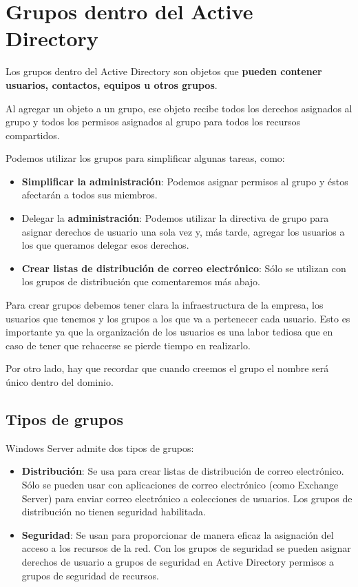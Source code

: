 \section{Grupos dentro del Active Directory}
Los grupos dentro del Active Directory son objetos que \textbf{pueden contener usuarios, contactos, equipos u otros grupos}.


Al agregar un objeto a un grupo, ese objeto recibe todos los derechos asignados al grupo y todos los permisos asignados al grupo para todos los recursos compartidos.

Podemos utilizar los grupos para simplificar algunas tareas, como:

\begin{itemize}
    \item \textbf{Simplificar la administración}: Podemos asignar permisos al grupo y éstos afectarán a todos sus miembros.
    \item Delegar la \textbf{administración}: Podemos utilizar la directiva de grupo para asignar derechos de usuario una sola vez y, más tarde, agregar los usuarios a los que queramos delegar esos derechos.
    \item \textbf{Crear listas de distribución de correo electrónico}: Sólo se utilizan con los grupos de distribución que comentaremos más abajo.
\end{itemize}

Para crear grupos debemos tener clara la infraestructura de la empresa, los usuarios que tenemos y los grupos a los que va a pertenecer cada usuario. Esto es importante ya que la organización de los usuarios es una labor tediosa que en caso de tener que rehacerse se pierde tiempo en realizarlo.

Por otro lado, hay que recordar que cuando creemos el grupo el nombre será único dentro del dominio.


\subsection{Tipos de grupos}
Windows Server admite dos tipos de grupos:

\begin{itemize}
    \item \textbf{Distribución}: Se usa para crear listas de distribución de correo electrónico. Sólo se pueden usar con aplicaciones de correo electrónico (como Exchange Server) para enviar correo electrónico a colecciones de usuarios. Los grupos de distribución no tienen seguridad habilitada.
    \item \textbf{Seguridad}: Se usan para proporcionar de manera eficaz la asignación del acceso a los recursos de la red. Con los grupos de seguridad se pueden asignar derechos de usuario a grupos de seguridad en Active Directory permisos a grupos de seguridad de recursos.
\end{itemize}

